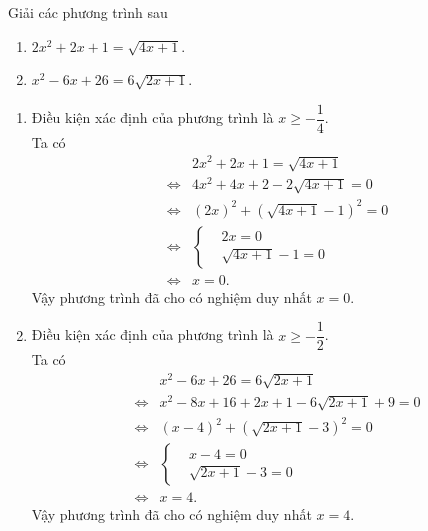 \begin{bt}
	Giải các phương trình sau
	\begin{enumerate}
		\item $2x^2+2x+1=\sqrt{4x+1}$.
		\item $x^2-6x+26=6\sqrt{2x+1}$.
	\end{enumerate}
	\loigiai
	{
		\begin{enumerate}
			\item Điều kiện xác định của phương trình là $x\geq -\dfrac{1}{4}$.\\
			Ta có
			\allowdisplaybreaks
			\begin{eqnarray*}
				&& 2x^2+2x+1=\sqrt{4x+1}\\
				&\Leftrightarrow & 4x^2+4x+2-2\sqrt{4x+1}=0 \\
				&\Leftrightarrow & (2x)^2+\left(\sqrt{4x+1}-1\right)^2=0\\
				&\Leftrightarrow & \left\{\begin{aligned}&2x=0 \\&\sqrt{4x+1}-1=0\end{aligned}\right.\\
				&\Leftrightarrow & x=0.
			\end{eqnarray*}
			Vậy phương trình đã cho có nghiệm duy nhất $x=0$.
			\item Điều kiện xác định của phương trình là $x\geq -\dfrac{1}{2}$.\\
			Ta có
			\allowdisplaybreaks
			\begin{eqnarray*}
				&& x^2-6x+26=6\sqrt{2x+1}\\
				&\Leftrightarrow & x^2-8x+16+2x+1-6\sqrt{2x+1}+9=0 \\
				&\Leftrightarrow & (x-4)^2+\left(\sqrt{2x+1}-3\right)^2=0\\
				&\Leftrightarrow & \left\{\begin{aligned}&x-4=0 \\&\sqrt{2x+1}-3=0\end{aligned}\right.\\
				&\Leftrightarrow & x=4.
			\end{eqnarray*}
			Vậy phương trình đã cho có nghiệm duy nhất $x=4$.
		\end{enumerate}
	}
\end{bt}

